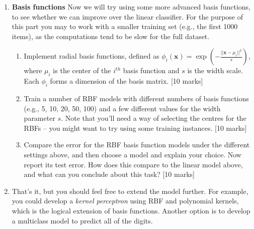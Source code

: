 \documentclass{article}
\begin{document}
\begin{enumerate}
\item \textbf{Basis functions} 
Now we will try using some more advanced basis functions, to see whether we can improve over the linear classifier. For the purpose of this part you may to work with a smaller training set (e.g., the first 1000 items), as the computations tend to be slow for the full dataset.
\begin{enumerate}
\item Implement radial basis functions, defined as $\phi_i(\mathbf{x}) = \exp\left( - \frac{ || \mathbf{x} - \mu_i ||^2 }{s} \right)$, where $\mu_i$ is the center of the $i^{th}$ basis function and $s$ is the width scale. Each $\phi_i$ forms a dimension of the basis matrix. \hfill [10 marks]
\item Train a number of RBF models with different numbers of basis functions (e.g., 5, 10, 20, 50, 100) and a few different values for the width parameter $s$. Note that you'll need a way of selecting the centres for the RBFs -- you might want to try using some training instances. \hfill [10 marks]
\item Compare the error for the RBF basis function models under the different settings above, and then choose a model and explain your choice. Now report its test error. How does this compare to the linear model above, and what can you conclude about this task? \hfill [10 marks]
\end{enumerate}

\item That's it, but you should feel free to extend the model further. For example, you could develop a \emph{kernel perceptron} using RBF and polynomial kernels, which is the logical extension of basis functions. Another option is to develop a multiclass model to predict all of the digits.

\end{enumerate}

\end{document}

